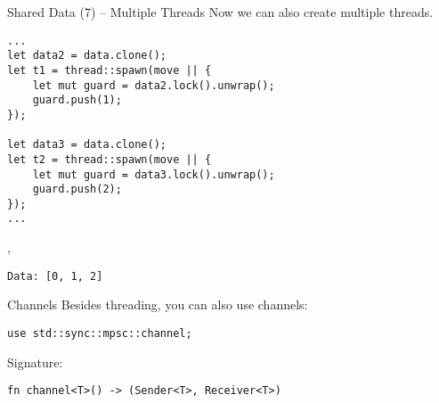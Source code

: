 \begin{frame}[fragile]{Shared Data (7) -- Multiple Threads}
Now we can also create multiple threads.
\begin{verbatim}
...
let data2 = data.clone();
let t1 = thread::spawn(move || {
    let mut guard = data2.lock().unwrap();
    guard.push(1);
});

let data3 = data.clone();
let t2 = thread::spawn(move || {
    let mut guard = data3.lock().unwrap();
    guard.push(2);
});
...
\end{verbatim}
\sep
\begin{verbatim}
Data: [0, 1, 2]
\end{verbatim}
\end{frame}

\begin{frame}[fragile]{Channels}
Besides threading, you can also use channels:
\begin{verbatim}
use std::sync::mpsc::channel;
\end{verbatim}
Signature:
\begin{verbatim}
fn channel<T>() -> (Sender<T>, Receiver<T>)
\end{verbatim}
\end{frame}
